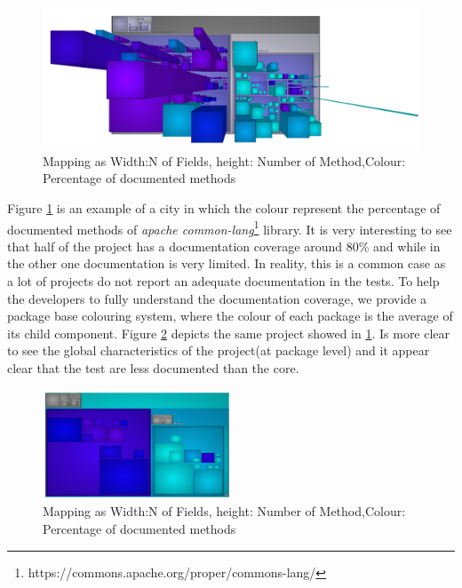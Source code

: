 \documentclass[]{usiinfbachelorproject}
\begin{document}
\begin{figure}[H]
	\centering
	\includegraphics[width=1\textwidth]{images/javaDoc}
	
	\caption[Java Documentation Mapping]{Mapping as Width:N of Fields, height: Number of Method,Colour: Percentage of documented methods\label{fig:javaDoc}}

\end{figure}

Figure \ref{fig:javaDoc} is an example of a city in which the colour represent the percentage of documented methods of \textit{apache common-lang}\footnote{https://commons.apache.org/proper/commons-lang/} library. It is very interesting to see that half of the project has a documentation coverage around  80\% and while in the other one documentation is very limited. In reality, this is a common case as a lot of projects do not report an adequate documentation in the tests.
To help the developers to fully understand the documentation coverage, we provide a  package base colouring system, where the colour of each package is the average of its child component. 
Figure \ref{fig:OnlyPackage} depicts  the same project showed in \ref{fig:javaDoc}. Is more clear to see the global characteristics of the project(at package level) and it appear clear that the test are less documented than the core.

\begin{figure}[H]
	\centering
	\includegraphics[width=0.5\textwidth]{images/javaDocOnlyPackage}
	
	\caption[Java Documentation Mapping Only Package]{Mapping as Width:N of Fields, height: Number of Method,Colour: Percentage of documented methods\label{fig:OnlyPackage}}
\end{figure}
\end{document}
